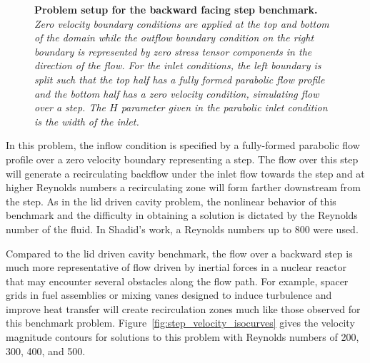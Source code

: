 \begin{figure}[htpb!]
  \begin{center}
    \scalebox{1.2}{
       }
  \end{center}
  \caption{\textbf{Problem setup for the backward facing step
      benchmark.} \textit{Zero velocity boundary conditions are
      applied at the top and bottom of the domain while the outflow
      boundary condition on the right boundary is represented by zero
      stress tensor components in the direction of the flow. For the
      inlet conditions, the left boundary is split such that the top
      half has a fully formed parabolic flow profile and the bottom
      half has a zero velocity condition, simulating flow over a
      step. The $H$ parameter given in the parabolic inlet condition
      is the width of the inlet.}}
  \label{fig:backward_facing_step}
\end{figure}

In this problem, the inflow condition is specified by a fully-formed
parabolic flow profile over a zero velocity boundary representing a
step. The flow over this step will generate a recirculating backflow
under the inlet flow towards the step and at higher Reynolds numbers a
recirculating zone will form farther downstream from the step. As in
the lid driven cavity problem, the nonlinear behavior of this
benchmark and the difficulty in obtaining a solution is dictated by
the Reynolds number of the fluid. In Shadid's work, a Reynolds numbers
up to 800 were used.

Compared to the lid driven cavity benchmark, the flow over a backward
step is much more representative of flow driven by inertial forces in
a nuclear reactor that may encounter several obstacles along the flow
path. For example, spacer grids in fuel assemblies or mixing vanes
designed to induce turbulence and improve heat transfer will create
recirculation zones much like those observed for this benchmark
problem. Figure~\ref{fig:step_velocity_isocurves} gives the velocity
magnitude contours for solutions to this problem with Reynolds numbers
of 200, 300, 400, and 500.

